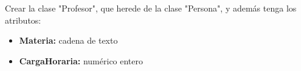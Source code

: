 
Crear la clase "Profesor", que herede de la clase "Persona", y adem\'as tenga los atributos:

\begin{itemize}[itemsep=0.2em]
    \item \textbf{Materia:} cadena de texto
    \item \textbf{CargaHoraria:} num\'erico entero
\end{itemize}


\volverindice
\newpage